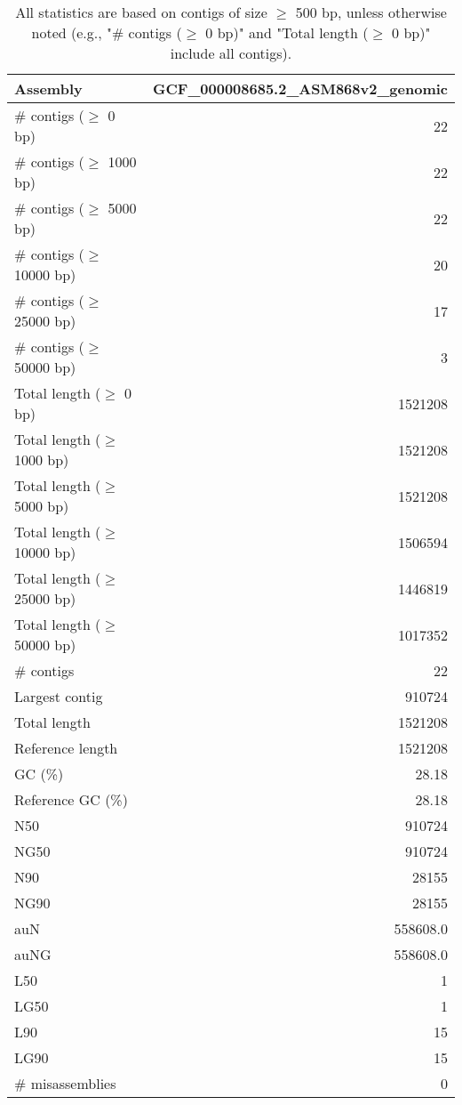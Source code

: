 \documentclass[12pt,a4paper]{article}
\begin{document}
\begin{table}[ht]
\begin{center}
\caption{All statistics are based on contigs of size $\geq$ 500 bp, unless otherwise noted (e.g., "\# contigs ($\geq$ 0 bp)" and "Total length ($\geq$ 0 bp)" include all contigs).}
\begin{tabular}{|l*{1}{|r}|}
\hline
Assembly & GCF\_000008685.2\_ASM868v2\_genomic \\ \hline
\# contigs ($\geq$ 0 bp) & 22 \\ \hline
\# contigs ($\geq$ 1000 bp) & 22 \\ \hline
\# contigs ($\geq$ 5000 bp) & 22 \\ \hline
\# contigs ($\geq$ 10000 bp) & 20 \\ \hline
\# contigs ($\geq$ 25000 bp) & 17 \\ \hline
\# contigs ($\geq$ 50000 bp) & 3 \\ \hline
Total length ($\geq$ 0 bp) & 1521208 \\ \hline
Total length ($\geq$ 1000 bp) & 1521208 \\ \hline
Total length ($\geq$ 5000 bp) & 1521208 \\ \hline
Total length ($\geq$ 10000 bp) & 1506594 \\ \hline
Total length ($\geq$ 25000 bp) & 1446819 \\ \hline
Total length ($\geq$ 50000 bp) & 1017352 \\ \hline
\# contigs & 22 \\ \hline
Largest contig & 910724 \\ \hline
Total length & 1521208 \\ \hline
Reference length & 1521208 \\ \hline
GC (\%) & 28.18 \\ \hline
Reference GC (\%) & 28.18 \\ \hline
N50 & 910724 \\ \hline
NG50 & 910724 \\ \hline
N90 & 28155 \\ \hline
NG90 & 28155 \\ \hline
auN & 558608.0 \\ \hline
auNG & 558608.0 \\ \hline
L50 & 1 \\ \hline
LG50 & 1 \\ \hline
L90 & 15 \\ \hline
LG90 & 15 \\ \hline
\# misassemblies & 0 \\ \hline

\end{tabular}
\end{center}
\end{table}
\end{document}
